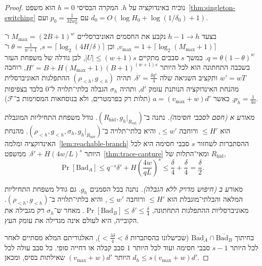 \documentclass[11pt,a4paper]{article}
\theoremstyle{definition}
\theoremstyle{remark}
\newcommand{\Prb}{\Pr}
\begin{document}
\begin{proof}
נוכיח באינדוקציה על $h$. המקרה הבסיסי $h = 0$ הוא משפט~\ref{thm:singleton-switching} עם $p_0 = \frac{1}{32w_0^2}$ ועם $d_0 = O(\log H_0 + \log(1/\delta_0) + 1)$.

בצעד $h-1 \to h$ נקבע את החסמים האוניברסליים $M_{\max} = (2B+1)^w$ ו־$v_{\max} = 1 + \lceil \log_2(M_{\max}+1) \rceil$, וכן $s = \lceil \log_2(4H/\delta)\rceil$, $\theta = \frac{1}{w+1}$ ו־$q = \theta(1-\theta)^w$. במשך $s$ סבבים מתקיים $|U| \le (w+1)s$, לכן גודלה של משפחת העזר בשכבה התחתונה הוא לכל היותר $H' = B + H(M_{\max}+1)(B+1)^{(w+1)s}$, רוחבה $w' = wT$ ותקציב השגיאה שלה $\delta' = \frac{\delta q^s}{4}$. תהיה $(\rho_{<h}, g_{<h})$ ההתפלגות האוניברסלית מהנחת האינדוקציה הנותנת עומק $d'$, ותהיה $\sigma_h$ הגבלה בלתי־תלויה ל־$0$ בלבד בצפיפות $p_h = \frac{1}{4a}$, כאשר $a = (v_{\max} + w)d'$ (תלות רק בפרמטרים, ולא בנוסחאות המסוימות ב־$\mathcal{F}$).

\emph{מאורע א (חסם לסבבי חסימה).} נתנה ב־$(R_{\mathrm{hid}}, g_h|_{R_{\mathrm{ext}}})$. גודל משפחת התחיליות המוגבלת הוא $\le H'$ ורוחבה $\le w'$, והיא בלתי־תלויה ב־$(\rho_{<h}, g_{<h}, \sigma_h, g_h|_{R_{\mathrm{hid}}})$. מהנחת האינדוקציה ומלמה~\ref{lem:reachable-branch} ההסתברות לשחזור $s$ סבבי חסימה היא לכל היותר $\delta' + H(4w/L)^s$. ממשפט~\ref{thm:trace-capture} ומאי־התלות של $R_{\mathrm{hid}}$,
\[
  \Prb[\mathrm{Bad}_A] \le q^{-s}\delta' + H\left(\frac{4w}{qL}\right)^s \le \frac{\delta}{4} + \frac{\delta}{4} = \frac{\delta}{2}.
\]

\emph{מאורע ב (חיפוש מדויק ללא הגבלה).} נתנה בכל הסמנים $g_h$. גם גודל משפחת התחיליות המלאה והבלתי־מוגבלת הוא $\le H'$ ורוחבה $\le w'$, והיא בלתי־תלויה ב־$(\rho_{<h}, g_{<h})$. מאוניברסליות ההתפלגות התחתונה, $\Prb[\mathrm{Bad}_B] \le \delta' \le \frac{\delta}{4}$. מאחר ש־$\sigma_h$ רק מגבילה את הקובייה, היא לעולם אינה מגדילה את עומק העץ.

בחיתוך $\overline{\mathrm{Bad}_A} \cap \overline{\mathrm{Bad}_B}$ (שכישלונו בהסתברות $< \frac{3\delta}{4} < \delta$), האלגוריתם המלא מסתיים לאחר לכל היותר $s - 1$ סבבי חסימה ועוד לכל היותר $1$ סבב קבלה או דחייה סופי. כל סבב עולה לכל היותר $(v_{\max} + w)d'$ שאילתות בסיס, ומכאן $d_h \le s(v_{\max} + w)d'$.
\end{proof}
\end{document}
